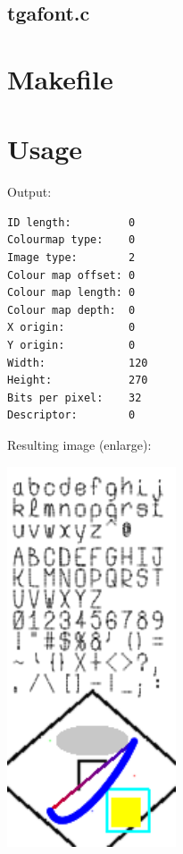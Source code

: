 \documentclass[12pt, a4paper]{article}
\begin{document}
\subsection{tgafont.c}

\begin{scriptsize}
\begin{ttfamily}

\end{ttfamily}
\end{scriptsize}

\section{Makefile}

\begin{scriptsize}
\begin{ttfamily}

\end{ttfamily}
\end{scriptsize}

\section{Usage}

\begin{scriptsize}
\begin{ttfamily}

\end{ttfamily}
\end{scriptsize}

Output:\\
\begin{scriptsize}
\begin{ttfamily}
\begin{lstlisting}
ID length:         0
Colourmap type:    0
Image type:        2
Colour map offset: 0
Colour map length: 0
Colour map depth:  0
X origin:          0
Y origin:          0
Width:             120
Height:            270
Bits per pixel:    32
Descriptor:        0
\end{lstlisting}
\end{ttfamily}
\end{scriptsize}


Resulting image (enlarge):\\
\begin{center}
\includegraphics[width=5cm]{tga.png}
\end{center} 
	
\end{document}
